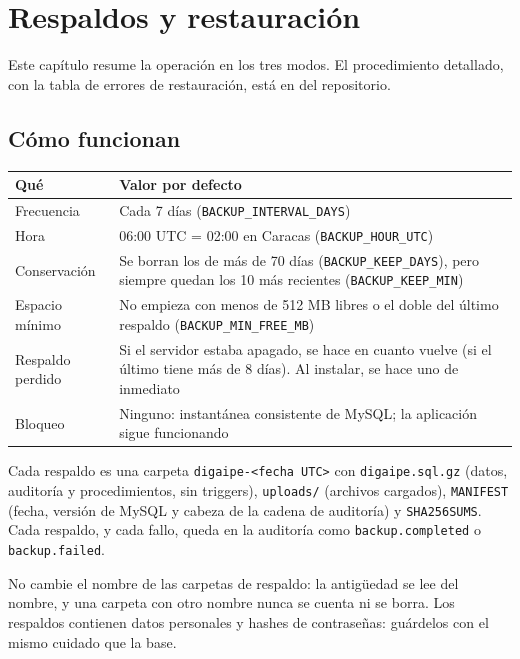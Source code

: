 \chapter{Respaldos y restauración}
\label{cap:respaldos}

Este capítulo resume la operación en los tres modos. El procedimiento detallado, con la tabla de
errores de restauración, está en  del repositorio.

\section{Cómo funcionan}

\begin{xltabular}{\linewidth}{@{}l L@{}}
	\toprule
	\textbf{Qué} & \textbf{Valor por defecto} \\
	\midrule
	\endhead
	Frecuencia & Cada 7 días (\texttt{BACKUP\_INTERVAL\_DAYS}) \\
	Hora & 06:00 UTC = 02:00 en Caracas (\texttt{BACKUP\_HOUR\_UTC}) \\
	Conservación & Se borran los de más de 70 días (\texttt{BACKUP\_KEEP\_DAYS}), pero siempre
	quedan los 10 más recientes (\texttt{BACKUP\_KEEP\_MIN}) \\
	Espacio mínimo & No empieza con menos de 512 MB libres o el doble del último respaldo
	(\texttt{BACKUP\_MIN\_FREE\_MB}) \\
	Respaldo perdido & Si el servidor estaba apagado, se hace en cuanto vuelve (si el último tiene
	más de 8 días). Al instalar, se hace uno de inmediato \\
	Bloqueo & Ninguno: instantánea consistente de MySQL; la aplicación sigue funcionando \\
	\bottomrule
\end{xltabular}

Cada respaldo es una carpeta \texttt{digaipe-<fecha UTC>} con \texttt{digaipe.sql.gz} (datos,
auditoría y procedimientos, sin triggers), \texttt{uploads/} (archivos cargados),
\texttt{MANIFEST} (fecha, versión de MySQL y cabeza de la cadena de auditoría) y
\texttt{SHA256SUMS}. Cada respaldo, y cada fallo, queda en la auditoría como
\texttt{backup.completed} o \texttt{backup.failed}.

\begin{aviso}
	No cambie el nombre de las carpetas de respaldo: la antigüedad se lee del nombre, y una carpeta
	con otro nombre nunca se cuenta ni se borra. Los respaldos contienen datos personales y hashes
	de contraseñas: guárdelos con el mismo cuidado que la base.
\end{aviso}

